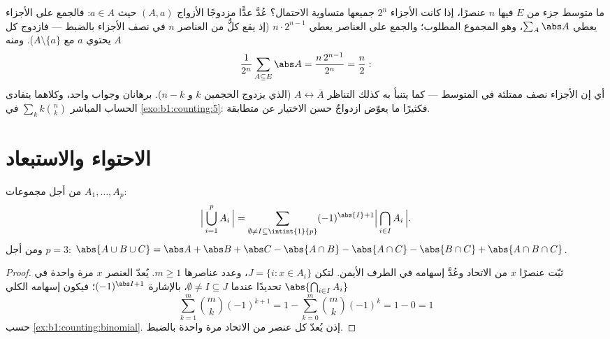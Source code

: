 \begin{example}\label{ex:b1:counting:averagesubset}
ما متوسط  جزء من  $E$ فيها $n$ عنصرًا، إذا كانت
الأجزاء $2^n$ جميعها متساوية الاحتمال؟ عُدَّ عدًّا مزدوجًا
الأزواج $(A, a)$ حيث $a \in A$: فالجمع على الأجزاء يعطي
$\sum_A \abs A$، وهو المجموع المطلوب؛ والجمع على العناصر يعطي
$n \cdot 2^{n-1}$ (إذ يقع كلٌّ من العناصر $n$ في نصف الأجزاء
بالضبط --- فازدوج كل $A$ يحتوي $a$ مع $A
\setminus \{a\}$). ومنه
\[
\frac{1}{2^n}\sum_{A \subseteq E} \abs A
= \frac{n\,2^{n-1}}{2^n} = \frac n2 :
\]
أي إن الأجزاء نصف ممتلئة في المتوسط --- كما يتنبأ به كذلك
التناظر $A
\leftrightarrow \overline A$ (الذي يزدوج الحجمين $k$
و $n - k$). برهانان وجواب واحد، وكلاهما يتفادى الحساب المباشر
$\sum_k k\binom nk$ في \cref{exo:b1:counting:5}: فكثيرًا ما
يعوّض ازدواجٌ حسن الاختيار عن متطابقة.
\end{example}

\section{الاحتواء والاستبعاد}

\begin{theorem}\label{thm:b1:counting:inclexcl}
من أجل مجموعات  $A_1, \dots, A_p$:
\[
\Bigl|\, \bigcup_{i=1}^{p} A_i \,\Bigr|
= \sum_{\emptyset \neq I \subseteq \intint{1}{p}}
(-1)^{\abs{I}+1} \Bigl|\, \bigcap_{i \in I} A_i \,\Bigr| .
\]
ومن أجل $p = 3$:
$\abs{A \cup B \cup C} = \abs A + \abs B + \abs C - \abs{A \cap B} -
\abs{A \cap C} - \abs{B \cap C} + \abs{A \cap B \cap C}$.
\end{theorem}

\begin{proof}
ثبّت عنصرًا $x$ من الاتحاد وعُدَّ إسهامه في الطرف الأيمن.
لتكن $J = \{i : x \in A_i\}$، وعدد عناصرها $m \geq
1$. يُعدّ العنصر $x$ مرة واحدة في $\abs{\bigcap_{i \in I} A_i}$
تحديدًا عندما $\emptyset \neq I \subseteq J$، بالإشارة
$(-1)^{\abs I + 1}$؛ فيكون إسهامه الكلي
\[
\sum_{k=1}^{m} \binom{m}{k} (-1)^{k+1}
= 1 - \sum_{k=0}^{m} \binom mk (-1)^k = 1 - 0 = 1
\]
حسب \cref{ex:b1:counting:binomial}. إذن يُعدّ كل عنصر من الاتحاد
مرة واحدة بالضبط.
\end{proof}

